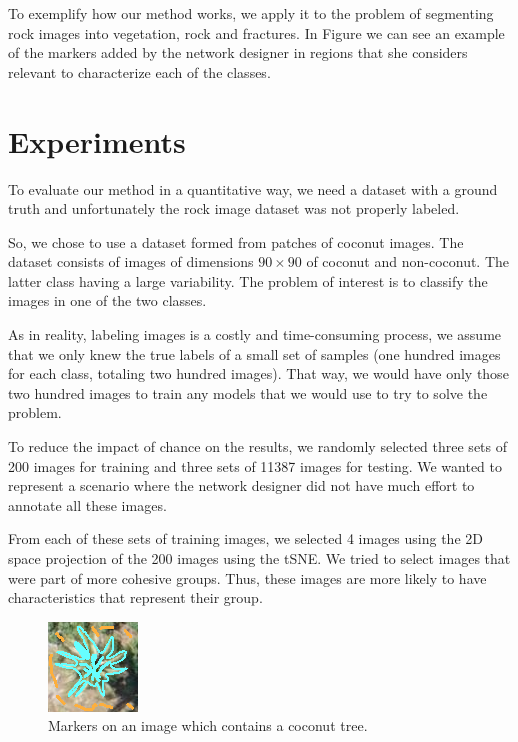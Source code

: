 \documentclass[a4paper,conference]{IEEEtran}
\begin{document}
To exemplify how our method works, we apply it to the problem of segmenting rock images into vegetation, rock and fractures. In Figure we can see an example of the markers added by the network designer in regions that she considers relevant to characterize each of the classes.

\section{Experiments}
To evaluate our method in a quantitative way, we need a dataset with a ground truth and unfortunately the rock image dataset was not properly labeled.

So, we chose to use a dataset formed from patches of coconut images. The dataset consists of images of dimensions $90 \times 90$ of coconut and non-coconut. The latter class having a large variability. The problem of interest is to classify the images in one of the two classes.

As in reality, labeling images is a costly and time-consuming process, we assume that we only knew the true labels of a small set of samples (one hundred images for each class, totaling two hundred images). That way, we would have only those two hundred images to train any models that we would use to try to solve the problem.

To reduce the impact of chance on the results, we randomly selected three sets of 200 images for training and three sets of 11387 images for testing. We wanted to represent a scenario where the network designer did not have much effort to annotate all these images.

From each of these sets of training images, we selected 4 images using the 2D space projection of the 200 images using the tSNE. We tried to select images that were part of more cohesive groups. Thus, these images are more likely to have characteristics that represent their group.

\begin{figure}[t]
    \begin{center}
       \includegraphics[width=0.4\linewidth]{figures/coco_markers.png}
    \end{center}
       \caption{Markers on an image which contains a coconut tree.}
    \label{fig:coco-markers}
  \end{figure}
  
\end{document}
